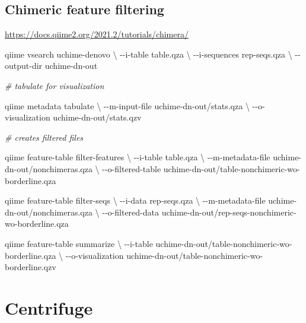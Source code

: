 \documentclass[
]{book}
\newenvironment{Shaded}{\begin{snugshade}}{\end{snugshade}}
\newcommand{\CommentTok}[1]{\textcolor[rgb]{0.56,0.35,0.01}{\textit{#1}}}
\newcommand{\DataTypeTok}[1]{\textcolor[rgb]{0.13,0.29,0.53}{#1}}
\newcommand{\ExtensionTok}[1]{#1}
\newcommand{\NormalTok}[1]{#1}
\begin{document}
\hypertarget{chimeric-feature-filtering}{%
\section{Chimeric feature filtering}\label{chimeric-feature-filtering}}

\url{https://docs.qiime2.org/2021.2/tutorials/chimera/}

\begin{Shaded}
\begin{Highlighting}[]
\ExtensionTok{qiime}\NormalTok{ vsearch uchime{-}denovo }\DataTypeTok{\textbackslash{}}
\NormalTok{{-}{-}i{-}table table.qza }\DataTypeTok{\textbackslash{}}
\NormalTok{{-}{-}i{-}sequences rep{-}seqs.qza }\DataTypeTok{\textbackslash{}}
\NormalTok{{-}{-}output{-}dir uchime{-}dn{-}out}

\CommentTok{\# tabulate for visualization}

\ExtensionTok{qiime}\NormalTok{ metadata tabulate }\DataTypeTok{\textbackslash{}}
\NormalTok{{-}{-}m{-}input{-}file uchime{-}dn{-}out/stats.qza }\DataTypeTok{\textbackslash{}}
\NormalTok{{-}{-}o{-}visualization uchime{-}dn{-}out/stats.qzv}

\CommentTok{\# creates filtered files}

\ExtensionTok{qiime}\NormalTok{ feature{-}table filter{-}features }\DataTypeTok{\textbackslash{}}
\NormalTok{{-}{-}i{-}table table.qza }\DataTypeTok{\textbackslash{}}
\NormalTok{{-}{-}m{-}metadata{-}file uchime{-}dn{-}out/nonchimeras.qza }\DataTypeTok{\textbackslash{}}
\NormalTok{{-}{-}o{-}filtered{-}table uchime{-}dn{-}out/table{-}nonchimeric{-}wo{-}borderline.qza }

\ExtensionTok{qiime}\NormalTok{ feature{-}table filter{-}seqs }\DataTypeTok{\textbackslash{}}
\NormalTok{{-}{-}i{-}data rep{-}seqs.qza }\DataTypeTok{\textbackslash{}}
\NormalTok{{-}{-}m{-}metadata{-}file uchime{-}dn{-}out/nonchimeras.qza }\DataTypeTok{\textbackslash{}}
\NormalTok{{-}{-}o{-}filtered{-}data uchime{-}dn{-}out/rep{-}seqs{-}nonchimeric{-}wo{-}borderline.qza }

\ExtensionTok{qiime}\NormalTok{ feature{-}table summarize }\DataTypeTok{\textbackslash{}}
\NormalTok{{-}{-}i{-}table uchime{-}dn{-}out/table{-}nonchimeric{-}wo{-}borderline.qza }\DataTypeTok{\textbackslash{}}
\NormalTok{{-}{-}o{-}visualization uchime{-}dn{-}out/table{-}nonchimeric{-}wo{-}borderline.qzv}
\end{Highlighting}
\end{Shaded}

\hypertarget{centrifuge}{%
\chapter{Centrifuge}\label{centrifuge}}
\end{document}
